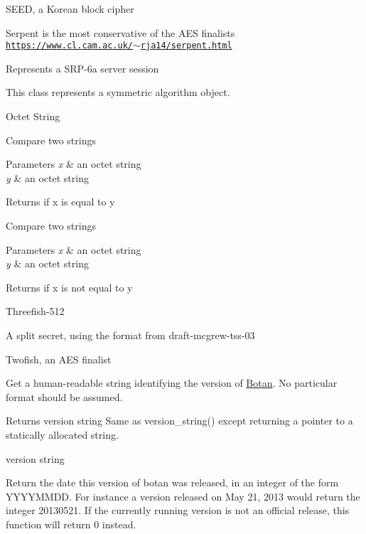 S\+E\+ED, a Korean block cipher

Serpent is the most conservative of the A\+ES finalists \href{https://www.cl.cam.ac.uk/~rja14/serpent.html}{\tt https\+://www.\+cl.\+cam.\+ac.\+uk/$\sim$rja14/serpent.\+html}

Represents a S\+R\+P-\/6a server session

This class represents a symmetric algorithm object.

Octet String

Compare two strings 
\begin{DoxyParams}{Parameters}
{\em x} & an octet string \\
\hline
{\em y} & an octet string \\
\hline
\end{DoxyParams}
\begin{DoxyReturn}{Returns}
if x is equal to y
\end{DoxyReturn}
Compare two strings 
\begin{DoxyParams}{Parameters}
{\em x} & an octet string \\
\hline
{\em y} & an octet string \\
\hline
\end{DoxyParams}
\begin{DoxyReturn}{Returns}
if x is not equal to y
\end{DoxyReturn}
Threefish-\/512

A split secret, using the format from draft-\/mcgrew-\/tss-\/03

Twofish, an A\+ES finalist

Get a human-\/readable string identifying the version of \hyperlink{namespace_botan}{Botan}. No particular format should be assumed. \begin{DoxyReturn}{Returns}
version string Same as version\+\_\+string() except returning a pointer to a statically allocated string. 

version string
\end{DoxyReturn}
Return the date this version of botan was released, in an integer of the form Y\+Y\+Y\+Y\+M\+M\+DD. For instance a version released on May 21, 2013 would return the integer 20130521. If the currently running version is not an official release, this function will return 0 instead.

